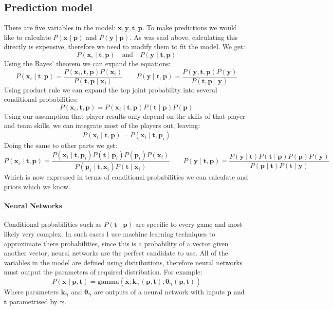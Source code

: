 \documentclass[12pt,a4paper]{book}
\newcommand\bs[1]{\boldsymbol{#1}}
\begin{document}
\subsection{Prediction model}
There are five variables in the model: $\bs{x},\bs{y},\bs{t},\bs{p}$.
To make predictions we would like to calculate $P(\bs{x}\mid \bs{p})$ and $P(\bs{y}\mid \bs{p})$.
As was said above, calculating this directly is expensive, therefore we need to modify them to fit the model.
We get:
\begin{equation}
P(\bs{x}_i \mid \bs{t},\bs{p})\quad \text{and} \quad P(\bs{y} \mid \bs{t},\bs{p})
\end{equation}
Using the Bayes' theorem we can expand the equations:
\begin{equation}
P(\bs{x}_i \mid \bs{t},\bs{p}) = \frac{P(\bs{x}_i,\bs{t},\bs{p})P(\bs{x}_i)}{P(\bs{t},\bs{p}\mid\bs{x}_i)}\qquad
P(\bs{y} \mid \bs{t},\bs{p}) = \frac{P(\bs{y},\bs{t},\bs{p})P(\bs{y})}{P(\bs{t},\bs{p}\mid\bs{y})}
\end{equation}
Using product rule we can expand the top joint probability into several conditional probabilities:
\begin{equation}
P(\bs{x}_i,\bs{t},\bs{p}) = P(\bs{x}_i\mid\bs{t},\bs{p})P(\bs{t}\mid\bs{p})P(\bs{p})
\end{equation}
Using our assumption that player results only depend on the skills of that player and team skills, we can integrate most of the players out, leaving:
\begin{equation}
P(\bs{x}_i\mid\bs{t},\bs{p}) = P(\bs{x}_i\mid\bs{t},\bs{p}_i)
\end{equation}
Doing the same to other parts we get:
\begin{equation}
P(\bs{x}_i \mid \bs{t},\bs{p}) = \frac{P(\bs{x}_i\mid\bs{t},\bs{p}_i)P(\bs{t}\mid\bs{p}_i)P(\bs{p}_i)P(\bs{x}_i)}{P(\bs{p}_i\mid\bs{t},\bs{x}_i)P(\bs{t}\mid\bs{x}_i)}\qquad
P(\bs{y} \mid \bs{t},\bs{p}) = \frac{P(\bs{y}\mid\bs{t})P(\bs{t}\mid\bs{p})P(\bs{p})P(\bs{y})}{P(\bs{p}\mid\bs{t})P(\bs{t}\mid\bs{y})}
\end{equation}
Which is now expressed in terms of conditional probabilities we can calculate and priors which we know.
\paragraph{Neural Networks}
Conditional probabilities such as $P(\bs{t}\mid \bs{p})$ are specific to every game and most likely very complex.
In such cases I use machine learning techniques to approximate there probabilities, since this is a probability of a vector given another vector, neural networks are the perfect candidate to use.
All of the variables in the model are defined using distributions, therefore neural networks must output the parameters of required distribution.
For example:
\begin{equation}
P(\bs{x} \mid \bs{p},\bs{t})=\text{gamma}(\bs{x};\bs{k_\gamma}(\bs{p},\bs{t}), \bs{\theta_\gamma}(\bs{p},\bs{t}))
\end{equation}
Where parameters $\bs{k_\gamma}$ and $\bs{\theta_\gamma}$ are outputs of a neural network with inputs $\bs{p}$ and $\bs{t}$ parametrised by $\bs{\gamma}$.
\end{document}
